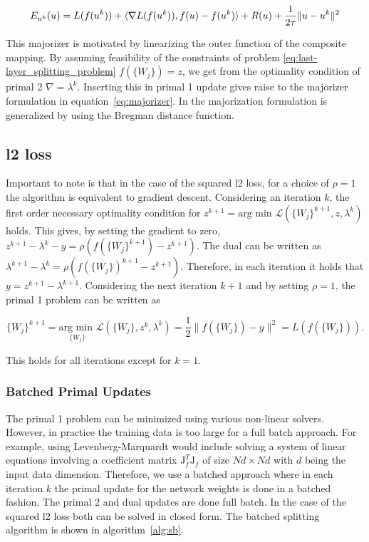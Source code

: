 \documentclass[english,11pt,a4paper]{article}
\begin{document}
\begin{equation}
	E_{u^k}(u) = L(f(u^k))
	+ \langle \nabla L(f(u^k)), f(u)-f(u^k) \rangle
	+ R(u) + \frac{1}{2 \tau} \|u - u^k \|^2
	\label{eq:majorizer}
\end{equation}

This majorizer is motivated by linearizing the outer function of the composite mapping. By assuming feasibility of the constraints of problem \ref{eq:last-layer_splitting_problem} $f(\{W_j\}) = z$, we get from the optimality condition of primal 2 $\nabla = \lambda^k$. Inserting this in primal 1 update gives raise to the majorizer formulation in equation~\ref{eq:majorizer}. In \cite{geiping2018composite} the majorization formulation is generalized by using the Bregman distance function.

\subsection{l2 loss}

Important to note is that in the case of the squared l2 loss, for a choice of $\rho=1$ the algorithm is equivalent to gradient descent. Considering an iteration $k$, the first order necessary optimality condition for $z^{k+1} = \text{arg min } \mathcal{L}(\{W_j\}^{k+1}, z, \lambda^k)$ holds. This gives, by setting the gradient to zero, $z^{k+1} - \lambda^k - y = \rho(f(\{W_j\}^{k+1}) - z^{k+1})$. The dual can be written as $\lambda^{k+1} - \lambda^k = \rho(f(\{W_j\})^{k+1} - z^{k+1})$. Therefore, in each iteration it holds that $y = z^{k+1} - \lambda^{k+1}$. Considering the next iteration $k+1$ and by setting $\rho=1$, the primal 1 problem can be written as 

\begin{equation}
	\{W_j\}^{k+1} = \underset{\{W_j\}}{\text{arg min }} \mathcal{L}(\{W_j\}, z^k, \lambda^k)
	= \frac{1}{2} \|f(\{W_j\}) - y\|^2 = L(f(\{W_j\})).
\end{equation}

This holds for all iterations except for $k=1$.

\subsubsection{Batched Primal Updates}

The primal 1 problem can be minimized using various non-linear solvers. However, in practice the training data is too large for a full batch approach. For example, using Levenberg-Marquardt would include solving a system of linear equations involving a coefficient matrix $\mathrm{J}_f^T \mathrm{J}_f$ of size $Nd \times Nd$ with $d$ being the input data dimension. Therefore, we use a batched approach where in each iteration $k$ the primal update for the network weights is done in a batched fashion. The primal 2 and dual updates are done full batch. In the case of the squared l2 loss both can be solved in closed form. The batched splitting algorithm is shown in algorithm~\ref{alg:sb}.
\end{document}
